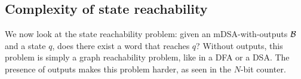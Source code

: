 \subsection{Complexity of state reachability}

We now look at the state reachability problem: given an mDSA-with-outputs $\mathcal{B}$ and a state $q$, does there exist a word that reaches $q$? Without outputs, this problem is simply a graph reachability problem, like in a DFA or a DSA. The presence of outputs makes this problem harder, as seen in the $N$-bit counter.




